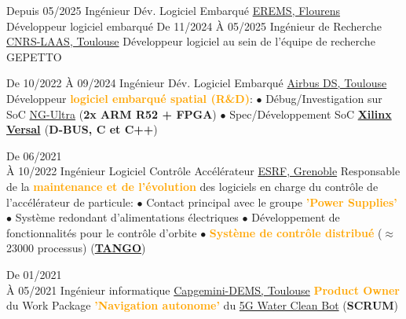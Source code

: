 \documentclass[
	a4paper,
	subsectioncolor=cvblue!70,
]{fortysecondscv}
\newcommand{\tango}{\href{https://www.tango-controls.org/}{TANGO}}
\newcommand{\hl}[1]{\textbf{\textcolor{orange}{#1}}}
\begin{document}
\begin{cvtable}[2]
  \cvitem
      {Depuis 05/2025}
      {Ingénieur Dév. Logiciel Embarqué}
      {\href{https://www.erems.fr/fr/}{EREMS, Flourens}}
  {
    Développeur logiciel embarqué
  }
  \cvitem
      {De 11/2024 \newline À 05/2025}
      {Ingénieur de Recherche}
      {\href{https://www.laas.fr/public/fr}{CNRS-LAAS, Toulouse}}
  {
    Développeur logiciel au sein de l'équipe de recherche GEPETTO
  }

  \cvitem
      {De 10/2022 \newline À 09/2024}
      {Ingénieur Dév. Logiciel Embarqué}
      {\href{https://fr.wikipedia.org/wiki/Airbus_Defence_and_Space}{Airbus DS, Toulouse}}
  {
    Développeur \hl{logiciel embarqué spatial (R\&D)}:
    \newline $\bullet$ {
      Débug/Investigation sur SoC
      \href{https://nanoxplore.org/index.php/product/ng-ultra/}{NG-Ultra}
      (\textbf{2x ARM R52 + FPGA})
    }
    \newline $\bullet$ {
      Spec/Développement SoC
      \hl{
        \href{https://www.xilinx.com/products/silicon-devices/acap/versal-ai-core.html}
             {Xilinx Versal}
      } (\textbf{D-BUS, C et C++})
    }
  }

  \cvitem
      {De 06/2021\\À 10/2022}
      {Ingénieur Logiciel Contrôle Accélérateur}
      {\href{https://www.esrf.fr/}{ESRF, Grenoble}}
  {
    Responsable de la \hl{maintenance et de l'évolution} des logiciels en charge
    du contrôle de l'accélérateur de particule:
    \newline $\bullet$ {
      Contact principal avec le groupe \hl{'Power Supplies'}
    }
    \newline $\bullet$ {
      Système redondant d'alimentations électriques
    }
    \newline $\bullet$ {
      Développement de fonctionnalités pour le contrôle d'orbite
    }
    \newline $\bullet$ {
      \hl{Système de contrôle distribué} ($\approx$ 23000 processus)
      (\textbf{\tango})
    }
  }

  \cvitem
      {De 01/2021\\À 05/2021}
      {Ingénieur informatique}
      {\href{https://www.capgemini.com/service/digital-services/digital-engineering-and-manufacturing-services/}{Capgemini-DEMS,
      Toulouse}}
  {
    \hl{Product Owner} du Work Package \hl{'Navigation autonome'} du
    \href{https://www.capgemini.com/fr-fr/solutions/5g-water-clean-bot/}{5G
      Water Clean Bot} (\textbf{SCRUM})
  }


\end{cvtable}
\end{document}
